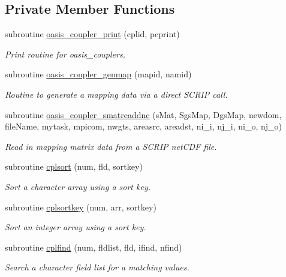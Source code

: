 \subsection*{Private Member Functions}
\begin{DoxyCompactItemize}
\item 
subroutine \hyperlink{classmod__oasis__coupler_a5cb96db0ae7b837db934689a49df3da6}{oasis\+\_\+coupler\+\_\+print} (cplid, pcprint)
\begin{DoxyCompactList}\small\item\em Print routine for oasis\+\_\+couplers. \end{DoxyCompactList}\item 
subroutine \hyperlink{classmod__oasis__coupler_ac2c7793ac3b82fe45f247644153fc83c}{oasis\+\_\+coupler\+\_\+genmap} (mapid, namid)
\begin{DoxyCompactList}\small\item\em Routine to generate a mapping data via a direct S\+C\+R\+I\+P call. \end{DoxyCompactList}\item 
subroutine \hyperlink{classmod__oasis__coupler_ae8b386486a7af783ff0a7d2d8295f827}{oasis\+\_\+coupler\+\_\+smatreaddnc} (s\+Mat, Sgs\+Map, Dgs\+Map, newdom, file\+Name, mytask, mpicom, nwgts, areasrc, areadst, ni\+\_\+i, nj\+\_\+i, ni\+\_\+o, nj\+\_\+o)
\begin{DoxyCompactList}\small\item\em Read in mapping matrix data from a S\+C\+R\+I\+P net\+C\+D\+F file. \end{DoxyCompactList}\item 
subroutine \hyperlink{classmod__oasis__coupler_a2748a288ff923c3b9c1aa5d0df6c8a30}{cplsort} (num, fld, sortkey)
\begin{DoxyCompactList}\small\item\em Sort a character array using a sort key. \end{DoxyCompactList}\item 
subroutine \hyperlink{classmod__oasis__coupler_a5604cb46a58d69c208b4bc166b2b28d8}{cplsortkey} (num, arr, sortkey)
\begin{DoxyCompactList}\small\item\em Sort an integer array using a sort key. \end{DoxyCompactList}\item 
subroutine \hyperlink{classmod__oasis__coupler_a773e323d2275aff227e05e98ce97def1}{cplfind} (num, fldlist, fld, ifind, nfind)
\begin{DoxyCompactList}\small\item\em Search a character field list for a matching values. \end{DoxyCompactList}\item 

\end{DoxyCompactItemize}
